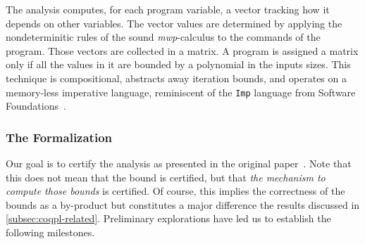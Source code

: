 The analysis computes, for each program variable, a vector tracking how it depends on other variables.
The vector values are determined by applying the nondeterminitic rules of the sound \emph{mwp}-calculus to the commands of the program.
Those vectors are collected in a matrix.
A program is assigned a matrix only if all the values in it are bounded by a polynomial in the inputs sizes.
This technique is compositional, abstracts away \eg iteration bounds, and operates on a memory-less imperative language, reminiscent of the \texttt{Imp} language from Software Foundations~\cite{cpierce20221}.

\subsubsection{The  Formalization}
\label{subsubsec:coqpl-the-coq-formalization}

Our goal is to certify the analysis as presented in {the original paper}~\cite{jones2009}.
Note that this does not mean that the bound is certified, but that \emph{the mechanism to compute those bounds} is certified.
Of course, this implies the correctness of the bounds as a by-product but constitutes a major difference \wrt the results discussed in \autoref{subsec:coqpl-related}.
Preliminary explorations have led us to establish the following milestones.

